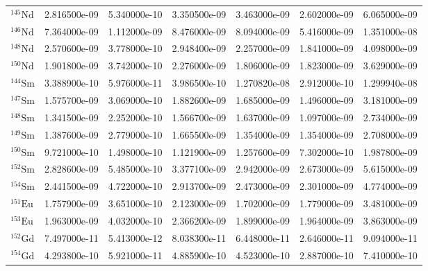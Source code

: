 \begin{tabular}{lrrrrrr}
$^{145}\mathrm{Nd}$ &       2.816500e-09 &      5.340000e-10 &      3.350500e-09 &       3.463000e-09 &      2.602000e-09 &      6.065000e-09 \\
$^{146}\mathrm{Nd}$ &       7.364000e-09 &      1.112000e-09 &      8.476000e-09 &       8.094000e-09 &      5.416000e-09 &      1.351000e-08 \\
$^{148}\mathrm{Nd}$ &       2.570600e-09 &      3.778000e-10 &      2.948400e-09 &       2.257000e-09 &      1.841000e-09 &      4.098000e-09 \\
$^{150}\mathrm{Nd}$ &       1.901800e-09 &      3.742000e-10 &      2.276000e-09 &       1.806000e-09 &      1.823000e-09 &      3.629000e-09 \\
$^{144}\mathrm{Sm}$ &       3.388900e-10 &      5.976000e-11 &      3.986500e-10 &       1.270820e-08 &      2.912000e-10 &      1.299940e-08 \\
$^{147}\mathrm{Sm}$ &       1.575700e-09 &      3.069000e-10 &      1.882600e-09 &       1.685000e-09 &      1.496000e-09 &      3.181000e-09 \\
$^{148}\mathrm{Sm}$ &       1.341500e-09 &      2.252000e-10 &      1.566700e-09 &       1.637000e-09 &      1.097000e-09 &      2.734000e-09 \\
$^{149}\mathrm{Sm}$ &       1.387600e-09 &      2.779000e-10 &      1.665500e-09 &       1.354000e-09 &      1.354000e-09 &      2.708000e-09 \\
$^{150}\mathrm{Sm}$ &       9.721000e-10 &      1.498000e-10 &      1.121900e-09 &       1.257600e-09 &      7.302000e-10 &      1.987800e-09 \\
$^{152}\mathrm{Sm}$ &       2.828600e-09 &      5.485000e-10 &      3.377100e-09 &       2.942000e-09 &      2.673000e-09 &      5.615000e-09 \\
$^{154}\mathrm{Sm}$ &       2.441500e-09 &      4.722000e-10 &      2.913700e-09 &       2.473000e-09 &      2.301000e-09 &      4.774000e-09 \\
$^{151}\mathrm{Eu}$ &       1.757900e-09 &      3.651000e-10 &      2.123000e-09 &       1.702000e-09 &      1.779000e-09 &      3.481000e-09 \\
$^{153}\mathrm{Eu}$ &       1.963000e-09 &      4.032000e-10 &      2.366200e-09 &       1.899000e-09 &      1.964000e-09 &      3.863000e-09 \\
$^{152}\mathrm{Gd}$ &       7.497000e-11 &      5.413000e-12 &      8.038300e-11 &       6.448000e-11 &      2.646000e-11 &      9.094000e-11 \\
$^{154}\mathrm{Gd}$ &       4.293800e-10 &      5.921000e-11 &      4.885900e-10 &       4.523000e-10 &      2.887000e-10 &      7.410000e-10 \\

\end{tabular}
